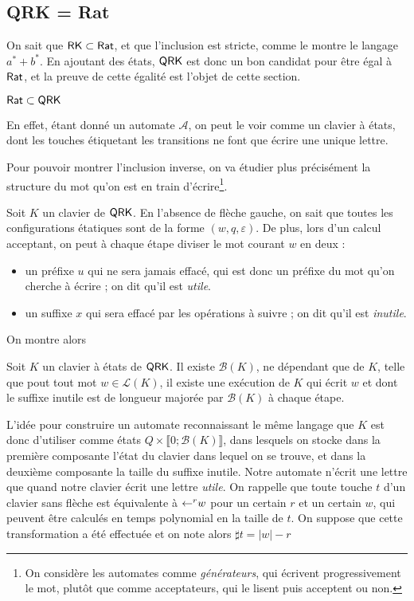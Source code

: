 \documentclass[12pt, a4paper]{article}
\renewcommand{\L}{\mathcal{L}}
\newcommand{\A}{\mathcal{A}}
\begin{document}
    \subsection{QRK = Rat}
    On sait que \autocite[théorèmes~101/102]{bible} $\mathsf{RK} \subset \mathsf{Rat}$, et que l'inclusion est stricte, comme le montre le langage $a^* + b^*$. En ajoutant des états,
    $\mathsf{QRK}$ est donc un bon candidat pour être égal à $\mathsf{Rat}$, et la preuve de cette égalité est l'objet de cette section.
    
    \begin{RatdansQRK}
        $\mathsf{Rat} \subset \mathsf{QRK}$
    \end{RatdansQRK}
    En effet, étant donné un automate $\A$, on peut le voir comme un clavier à états, dont les touches étiquetant les transitions 
    ne font que écrire une unique lettre.

    Pour pouvoir montrer l'inclusion inverse, on va étudier plus précisément la structure du mot qu'on est en train d'écrire\footnote{On considère les automates comme \emph{générateurs}, qui écrivent progressivement le mot, plutôt que comme acceptateurs, qui le lisent puis acceptent ou non.}.
    
    Soit $K$ un clavier de $\mathsf{QRK}$. En l'absence de flèche gauche, on sait que toutes les configurations étatiques sont de la forme $(w,q,\varepsilon)$. De plus, lors d'un calcul acceptant, on peut à chaque étape diviser le mot courant $w$ en deux :
    \begin{itemize}
        \item un préfixe $u$ qui ne sera jamais effacé, qui est donc un préfixe du mot qu'on cherche à écrire ; on dit qu'il est \emph{utile}.
        \item un suffixe $x$ qui sera effacé par les opérations à suivre ; on dit qu'il est \emph{inutile}.
    \end{itemize}
    On montre alors
    \begin{inutilesbornés}
        Soit $K$ un clavier à états de $\mathsf{QRK}$. Il existe $\mathcal{B}(K)$, ne dépendant que de $K$, telle que pout tout mot $w \in \L(K)$,
        il existe une exécution de $K$ qui écrit $w$ et dont le suffixe inutile est de longueur majorée par $\mathcal{B}(K)$ à chaque étape.
    \end{inutilesbornés}
    L'idée pour construire un automate reconnaissant le même langage que $K$ est donc d'utiliser comme états $Q \times \llbracket 0 ; \mathcal{B}(K) \rrbracket$, dans lesquels on stocke dans la première composante l'état du clavier dans lequel on se trouve,
    et dans la deuxième composante la taille du suffixe inutile. Notre automate n'écrit une lettre que quand notre clavier écrit une lettre \emph{utile}.
    On rappelle que toute touche $t$ d'un clavier sans flèche est équivalente à $\mathord{\leftarrow}^r w$ pour un certain $r$ et un certain $w$, qui peuvent être calculés en temps polynomial en la taille de $t$. On suppose que cette transformation a été effectuée et on note alors $\sharp t = |w| - r$
\end{document}
